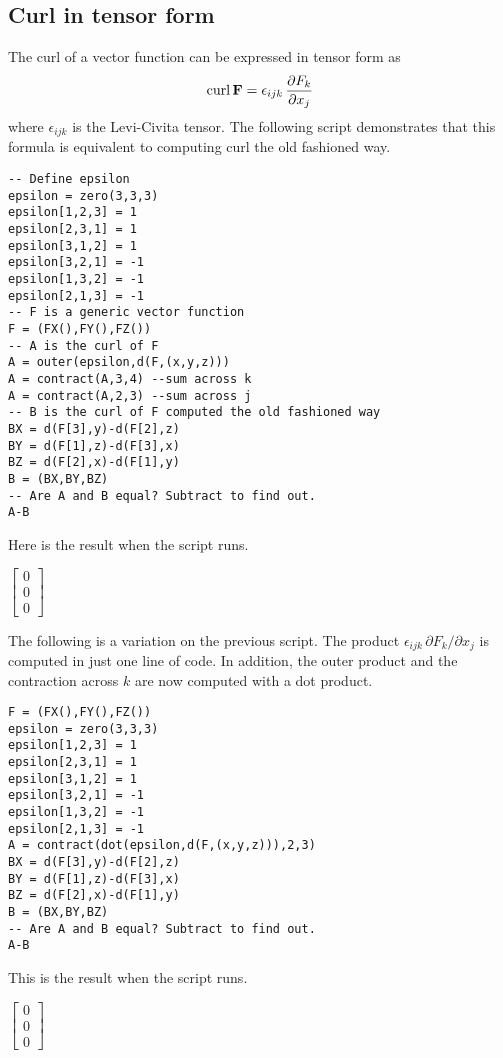 
\subsection{Curl in tensor form}
The curl of a vector function can be expressed in tensor form as
$$\mathop{\rm curl}{\bf F}=\epsilon_{ijk}\,{\partial F_k\over\partial x_j}$$
where $\epsilon_{ijk}$ is the Levi-Civita tensor.
The following script demonstrates that this formula is equivalent
to computing curl the old fashioned way.

\begin{Verbatim}[formatcom=\color{blue},samepage=true]
-- Define epsilon
epsilon = zero(3,3,3)
epsilon[1,2,3] = 1
epsilon[2,3,1] = 1
epsilon[3,1,2] = 1
epsilon[3,2,1] = -1
epsilon[1,3,2] = -1
epsilon[2,1,3] = -1
-- F is a generic vector function
F = (FX(),FY(),FZ())
-- A is the curl of F
A = outer(epsilon,d(F,(x,y,z)))
A = contract(A,3,4) --sum across k
A = contract(A,2,3) --sum across j
-- B is the curl of F computed the old fashioned way
BX = d(F[3],y)-d(F[2],z)
BY = d(F[1],z)-d(F[3],x)
BZ = d(F[2],x)-d(F[1],y)
B = (BX,BY,BZ)
-- Are A and B equal? Subtract to find out.
A-B
\end{Verbatim}

Here is the result when the script runs.

$\displaystyle \begin{bmatrix}0\\0\\0\end{bmatrix}$

The following is a variation on the previous script.
The product $\epsilon_{ijk}\,\partial F_k/\partial x_j$
is computed in just one line of code.
In addition, the outer product and the contraction across $k$
are now computed with a dot product.

\begin{Verbatim}[formatcom=\color{blue},samepage=true]
F = (FX(),FY(),FZ())
epsilon = zero(3,3,3)
epsilon[1,2,3] = 1
epsilon[2,3,1] = 1
epsilon[3,1,2] = 1
epsilon[3,2,1] = -1
epsilon[1,3,2] = -1
epsilon[2,1,3] = -1
A = contract(dot(epsilon,d(F,(x,y,z))),2,3)
BX = d(F[3],y)-d(F[2],z)
BY = d(F[1],z)-d(F[3],x)
BZ = d(F[2],x)-d(F[1],y)
B = (BX,BY,BZ)
-- Are A and B equal? Subtract to find out.
A-B
\end{Verbatim}

This is the result when the script runs.

$\displaystyle \begin{bmatrix}0\\0\\0\end{bmatrix}$
